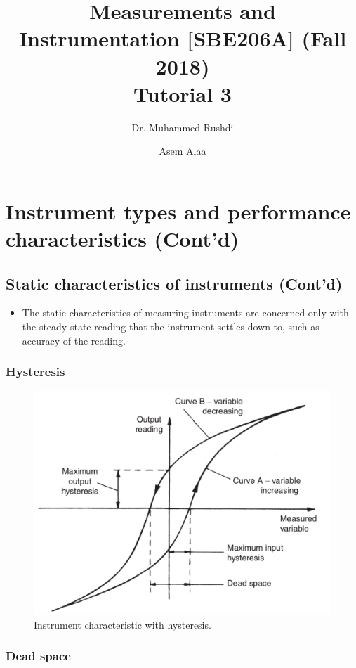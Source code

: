 \documentclass[a4paper,11pt]{book}
\begin{document}
\author{Dr. Muhammed Rushdi \and Asem Alaa}

\title{Measurements and Instrumentation [SBE206A] (Fall 2018)\\ Tutorial 3}

\maketitle

\chapter*{Instrument types and performance characteristics (Cont'd)}


\section*{Static characteristics of instruments (Cont'd)}

\begin{itemize}
\item The static characteristics of measuring instruments are concerned only with the steady-state reading that the instrument settles down to, such as accuracy of the reading.
\end{itemize}

\subsection*{Hysteresis}


\begin{figure}[h!]\label{fig:hysteresis}
\centering
  \includegraphics[width=0.7\linewidth]{hysteresis}
  \caption{ Instrument characteristic with hysteresis.} 
\end{figure}


\subsection*{Dead space}
\end{document}
